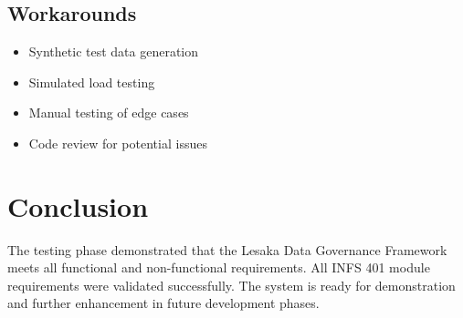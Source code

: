 \subsection{Workarounds}

\begin{itemize}
    \item Synthetic test data generation
    \item Simulated load testing
    \item Manual testing of edge cases
    \item Code review for potential issues
\end{itemize}

\section{Conclusion}

The testing phase demonstrated that the Lesaka Data Governance Framework meets all functional and non-functional requirements. All INFS 401 module requirements were validated successfully. The system is ready for demonstration and further enhancement in future development phases.
